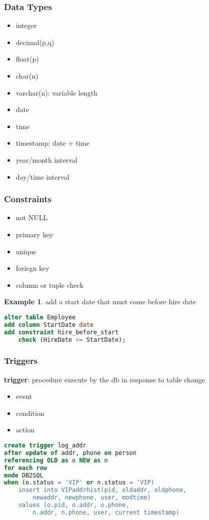 \documentclass[]{article}
\theoremstyle{definition}
\newtheorem{ex}{Example}[section]
\begin{document}
		\subsubsection{Data Types}
			\begin{multicols}{2}
				\begin{itemize}
					\item integer
					\item decimal(p,q)
					\item float(p)
					\item char(n)
					\item varchar(n): variable length
					\item date
					\item time
					\item timestamp: date + time
					\item year/month interval
					\item day/time interval
				\end{itemize}
			\end{multicols}
		\subsubsection{Constraints}
			\begin{itemize}
				\item not NULL
				\item primary key
				\item unique
				\item foriegn key
				\item column or tuple check
			\end{itemize}
			\begin{ex}
				add a start date that must come before hire date
				\begin{lstlisting}[language=SQL]
alter table Employee
add column StartDate date
add constraint hire_before_start
	check (HireDate <= StartDate);
				\end{lstlisting}
			\end{ex}
		\subsubsection{Triggers}
			\textbf{trigger}: procedure execute by the db in response to table change
			\begin{itemize}
				\item event
				\item condition
				\item action
			\end{itemize}
			\begin{lstlisting}[language=SQL]
create trigger log_addr
after update of addr, phone on person
referencing OLD as o NEW as n
for each row 
mode DB2SQL
when (o.status = 'VIP' or n.status = 'VIP)
	insert into VIPaddrhist(pid, oldaddr, oldphone,
		newaddr, newphone, user, modtime)
	values (o.pid, o.addr, o.phone,
		n.addr, n.phone, user, current timestamp)
			\end{lstlisting}
\end{document}
